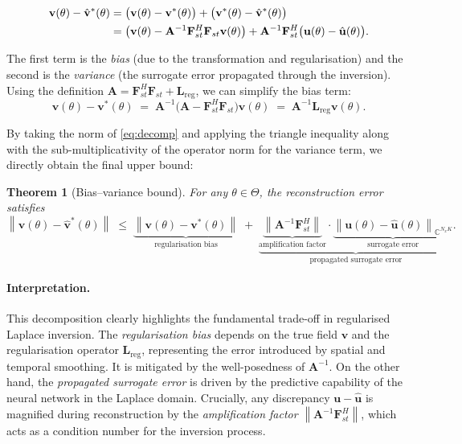\documentclass[11pt, a4paper]{article}
\newtheorem{theorem}{Theorem}[section]
\newcommand{\C}{\mathbb{C}}
\newcommand{\norm}[1]{\left\|#1\right\|}
\begin{document}
\begin{align}
  \mathbf{v}(\theta) - \hat{\mathbf{v}}^*(\theta)
  &= \bigl(\mathbf{v}(\theta) - \mathbf{v}^*(\theta)\bigr)
   + \bigl(\mathbf{v}^*(\theta) - \hat{\mathbf{v}}^*(\theta)\bigr) \notag \\
  &= \bigl(\mathbf{v}(\theta) - \mathbf{A}^{-1}\mathbf{F}_{st}^H\mathbf{F}_{st}\mathbf{v}(\theta)\bigr)
   + \mathbf{A}^{-1}\mathbf{F}_{st}^H
       \bigl(\mathbf{u}(\theta) - \hat{\mathbf{u}}(\theta)\bigr).
  \label{eq:decomp}
\end{align}

The first term is the \emph{bias} (due to the transformation and regularisation) and the second is the \emph{variance} (the surrogate error propagated through the inversion). Using the definition $\mathbf{A} = \mathbf{F}_{st}^H\mathbf{F}_{st} + \mathbf{L}_{\mathrm{reg}}$, we can simplify the bias term:
\begin{equation}
  \mathbf{v}(\theta) - \mathbf{v}^*(\theta)
  \;=\; \mathbf{A}^{-1}\bigl(\mathbf{A} - \mathbf{F}_{st}^H\mathbf{F}_{st}\bigr)\mathbf{v}(\theta)
  \;=\; \mathbf{A}^{-1}\mathbf{L}_{\mathrm{reg}}\mathbf{v}(\theta).
\end{equation}

By taking the norm of \eqref{eq:decomp} and applying the triangle inequality along with the sub-multiplicativity of the operator norm for the variance term, we directly obtain the final upper bound:

\begin{theorem}[Bias--variance bound]
  \label{thm:bv}
  For any $\theta \in \Theta$, the reconstruction error satisfies
  \begin{equation}
    \label{eq:bv_bound}
    \norm{\mathbf{v}(\theta) - \hat{\mathbf{v}}^*(\theta)}
    \;\leq\;
    \underbrace{
      \norm{\mathbf{v}(\theta) - \mathbf{v}^*(\theta)}
    }_{\text{regularisation bias}}
    \;+\;
    \underbrace{
      \underbrace{\norm{\mathbf{A}^{-1}\mathbf{F}_{st}^H}}_{\text{amplification factor}} \cdot \underbrace{\norm{\mathbf{u}(\theta) - \hat{\mathbf{u}}(\theta)}_{\C^{N_x K}}}_{\text{surrogate error}}
    }_{\text{propagated surrogate error}}.
  \end{equation}
\end{theorem}

\paragraph{Interpretation.}
This decomposition clearly highlights the fundamental trade-off in regularised Laplace inversion. The \emph{regularisation bias} depends on the true field $\mathbf{v}$ and the regularisation operator $\mathbf{L}_{\mathrm{reg}}$, representing the error introduced by spatial and temporal smoothing. It is mitigated by the well-posedness of $\mathbf{A}^{-1}$. On the other hand, the \emph{propagated surrogate error} is driven by the predictive capability of the neural network in the Laplace domain. Crucially, any discrepancy $\mathbf{u} - \hat{\mathbf{u}}$ is magnified during reconstruction by the \emph{amplification factor} $\norm{\mathbf{A}^{-1}\mathbf{F}_{st}^H}$, which acts as a condition number for the inversion process.
\end{document}
